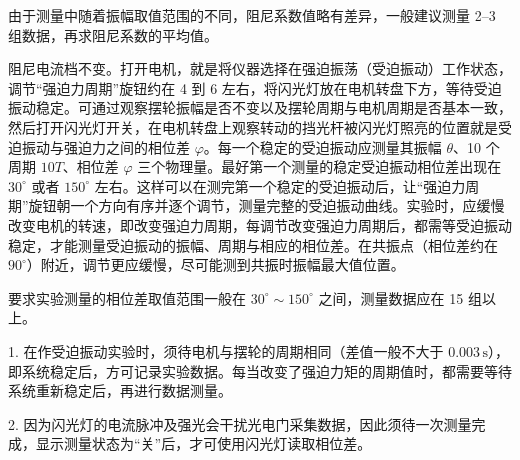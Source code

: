 由于测量中随着振幅取值范围的不同，阻尼系数值略有差异，一般建议测量 2--3 组数据，再求阻尼系数的平均值。

阻尼电流档不变。打开电机，就是将仪器选择在强迫振荡（受迫振动）工作状态，调节“强迫力周期”旋钮约在 4 到 6 左右，将闪光灯放在电机转盘下方，等待受迫振动稳定。可通过观察摆轮振幅是否不变以及摆轮周期与电机周期是否基本一致，然后打开闪光灯开关，在电机转盘上观察转动的挡光杆被闪光灯照亮的位置就是受迫振动与强迫力之间的相位差 $\varphi$。每一个稳定的受迫振动应测量其振幅 $\theta$、10 个周期 $10T$、相位差 $\varphi$ 三个物理量。最好第一个测量的稳定受迫振动相位差出现在 $30^\circ$ 或者 $150^\circ$ 左右。这样可以在测完第一个稳定的受迫振动后，让“强迫力周期”旋钮朝一个方向有序并逐个调节，测量完整的受迫振动曲线。实验时，应缓慢改变电机的转速，即改变强迫力周期，每调节改变强迫力周期后，都需等受迫振动稳定，才能测量受迫振动的振幅、周期与相应的相位差。在共振点（相位差约在 $90^\circ$）附近，调节更应缓慢，尽可能测到共振时振幅最大值位置。

要求实验测量的相位差取值范围一般在 $30^\circ\sim150^\circ$ 之间，测量数据应在 15 组以上。

1. 在作受迫振动实验时，须待电机与摆轮的周期相同（差值一般不大于 $0.003\,\mathrm{s}$），即系统稳定后，方可记录实验数据。每当改变了强迫力矩的周期值时，都需要等待系统重新稳定后，再进行数据测量。\par
2. 因为闪光灯的电流脉冲及强光会干扰光电门采集数据，因此须待一次测量完成，显示测量状态为“关”后，才可使用闪光灯读取相位差。

